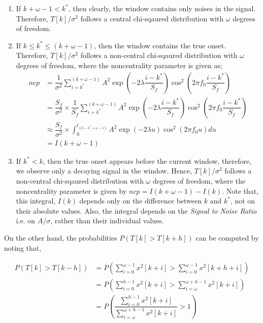 \documentclass[10pt]{article}
\begin{document}
\begin{enumerate}
    \item If $k+\omega -1 < k^*$, then clearly, the window contains only noises in the signal. Therefore, $T[k]/\sigma^2$ follows a central chi-sqaured distribution with $\omega$ degrees of freedom.
    \item If $k \leq k^* \leq (k + \omega - 1)$, then the window contains the true onset. Therefore, $T[k]/\sigma^2$ follows a non-central chi-sqaured distribution with $\omega$ degrees of freedom, where the noncentrality parameter is given as;
    \begin{align*}
        ncp & = \dfrac{1}{\sigma^2}\sum_{i=k^*}^{(k + \omega - 1)}{A^2 \exp{\left( -2\lambda \dfrac{i-k^*}{S_f}\right)} \cos^2{\left( 2\pi f_0 \dfrac{i-k^*}{S_f} \right)}}\\
        & = \dfrac{S_f}{\sigma^2} \times \dfrac{1}{S_f}\sum_{i=k^*}^{(k + \omega - 1)}{A^2 \exp{\left( -2\lambda \dfrac{i-k^*}{S_f}\right)} \cos^2{\left( 2\pi f_0 \dfrac{i-k^*}{S_f} \right)}}\\
        & \approx \dfrac{S_f}{\sigma^2} \times \int_{0}^{t_{(k - k^* + \omega - 1)}} {A^2 \exp{\left( -2\lambda u\right)} \cos^2{\left( 2\pi f_0 u\right)} du}\\
        & = I(k + \omega - 1)
    \end{align*}
    \item If $k^* < k$, then the true onset appears before the current window, therefore, we observe only a decaying signal in the window. Hence, $T[k]/\sigma^2$ follows a non-central chi-sqaured distribution with $\omega$ degrees of freedom, where the noncentrality parameter is given by $ncp = I(k + \omega - 1) - I(k)$. Note that, this integral, $I(k)$ depends only on the difference between $k$ and $k^*$, not on their absolute values. Also, the integral depends on the \textit{Signal to Noise Ratio} i.e. on $A/\sigma$, rather than their individual values.
\end{enumerate}

On the other hand, the probabilities $P(T[k] > T[k + h])$ can be computed by noting that,

\begin{align*}
    P(T[k] > T[k - h]) & = P(\sum_{i=0}^{\omega - 1}x^2[k+i] > \sum_{i=0}^{\omega - 1}x^2[k+h+i])\\
    & = P(\sum_{i=0}^{h - 1}x^2[k+i] > \sum_{i=\omega}^{\omega + h - 1}x^2[k+i]) \\
    & = P\left(\dfrac{\sum_{i=0}^{h - 1}x^2[k+i]}{\sum_{i=\omega}^{\omega + h - 1}x^2[k+i]} > 1\right)
\end{align*}
\end{document}
